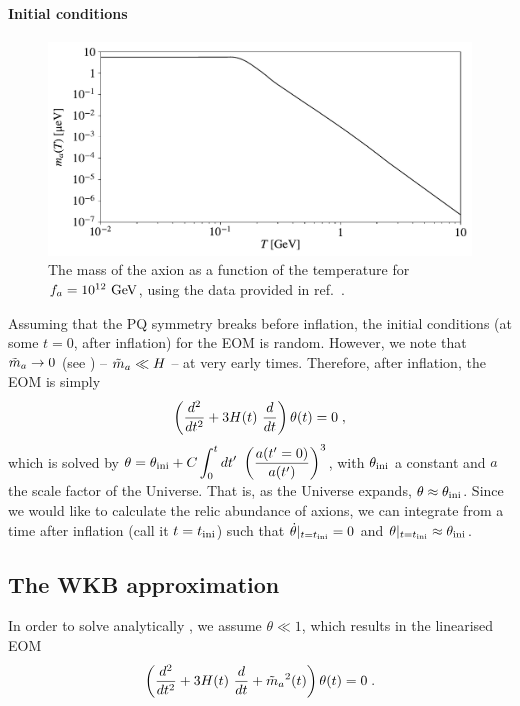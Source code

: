 \documentclass[11pt,a4paper]{article}
\begin{document}
\paragraph{Initial conditions}
%
\begin{figure}[h!]
	\includegraphics[width=1\textwidth]{figs/axion_mass.pdf}
	\caption{The mass of the axion as a function of the temperature for $f_{a}{}=10^{12}~{\rm GeV}$, using the data provided in ref.~\cite{Borsanyi:2016ksw}.}
	\label{fig:axion_mass}
\end{figure}
%
Assuming that the PQ symmetry breaks before inflation, the initial conditions (\ie at some $t=0$, after inflation) for the EOM is random. However, we note that $\tilde m_{a}{} \to 0$ (see ) -- \ie $\tilde m_{a}{} \ll H$ -- at very early times. Therefore, after inflation, the EOM is simply
%
\begin{equation}
	\left( \dfrac{d^2}{d t^2} + 3 H(t) \ \dfrac{d}{d t}   \right) \theta(t) = 0 \; ,
	\label{eq:massless_eom}
\end{equation}
%
which is solved by $\theta = \theta_{\rm ini}{} + C \displaystyle \int_{0}^t d t' \ \left(  \dfrac{a(t'=0)}{a(t')}  \right)^3$, with $\theta_{\rm ini}{}$ a constant and $a$ the scale factor of the Universe. That is, as the Universe expands, $\theta \approx \theta_{\rm ini}{}$. Since we would like to calculate the relic abundance of axions, we can integrate  from a time after inflation (call it $t = t_{\rm ini}{}$) such that $ \dot \theta |_{t=t_{\rm ini}{}} = 0$ and  $\theta|_{t=t_{\rm ini}{}} \approx \theta_{\rm ini}{}$.   



\subsection{The WKB approximation}
%
In order to solve analytically , we assume $\theta \ll 1$, which results in the linearised EOM
%
\begin{equation}
	\left( \dfrac{d^2}{d t^2} + 3 H(t) \ \dfrac{d}{d t} + \tilde m_{a}{}^2(t)  \right) \theta(t) = 0 \; .
	\label{eq:linear_eom}
\end{equation}
\end{document}

